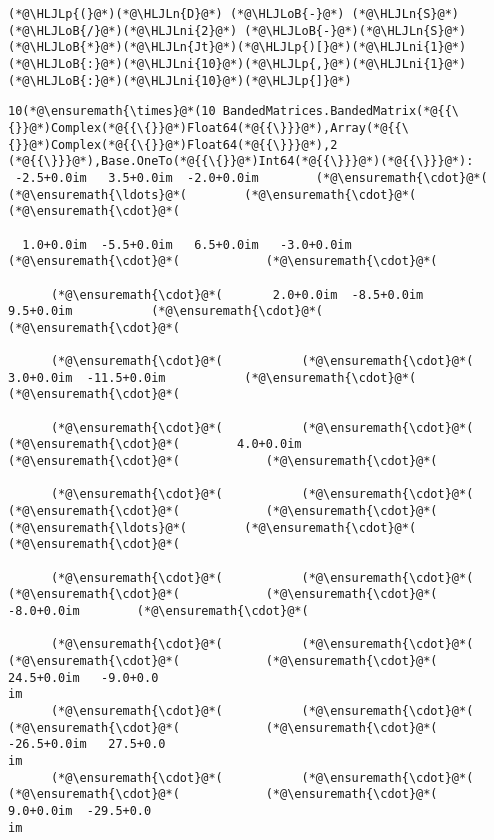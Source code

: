 \documentclass[12pt,landscape]{article}
\newcommand{\HLJLn}[1]{#1}
\newcommand{\HLJLni}[1]{\textcolor[RGB]{59,151,46}{#1}}
\newcommand{\HLJLoB}[1]{\textcolor[RGB]{102,102,102}{\textbf{#1}}}
\newcommand{\HLJLp}[1]{#1}
\begin{document}
{\begin{lstlisting}
(*@\HLJLp{(}@*)(*@\HLJLn{D}@*) (*@\HLJLoB{-}@*) (*@\HLJLn{S}@*)(*@\HLJLoB{/}@*)(*@\HLJLni{2}@*) (*@\HLJLoB{-}@*)(*@\HLJLn{S}@*)(*@\HLJLoB{*}@*)(*@\HLJLn{Jt}@*)(*@\HLJLp{)[}@*)(*@\HLJLni{1}@*)(*@\HLJLoB{:}@*)(*@\HLJLni{10}@*)(*@\HLJLp{,}@*)(*@\HLJLni{1}@*)(*@\HLJLoB{:}@*)(*@\HLJLni{10}@*)(*@\HLJLp{]}@*)
\end{lstlisting}

\begin{lstlisting}
10(*@\ensuremath{\times}@*(10 BandedMatrices.BandedMatrix(*@{{\{}}@*)Complex(*@{{\{}}@*)Float64(*@{{\}}}@*),Array(*@{{\{}}@*)Complex(*@{{\{}}@*)Float64(*@{{\}}}@*),2
(*@{{\}}}@*),Base.OneTo(*@{{\{}}@*)Int64(*@{{\}}}@*)(*@{{\}}}@*):
 -2.5+0.0im   3.5+0.0im  -2.0+0.0im        (*@\ensuremath{\cdot}@*(      (*@\ensuremath{\ldots}@*(        (*@\ensuremath{\cdot}@*(            (*@\ensuremath{\cdot}@*(  
  
  1.0+0.0im  -5.5+0.0im   6.5+0.0im   -3.0+0.0im           (*@\ensuremath{\cdot}@*(            (*@\ensuremath{\cdot}@*(  
  
      (*@\ensuremath{\cdot}@*(       2.0+0.0im  -8.5+0.0im    9.5+0.0im           (*@\ensuremath{\cdot}@*(            (*@\ensuremath{\cdot}@*(  
  
      (*@\ensuremath{\cdot}@*(           (*@\ensuremath{\cdot}@*(       3.0+0.0im  -11.5+0.0im           (*@\ensuremath{\cdot}@*(            (*@\ensuremath{\cdot}@*(  
  
      (*@\ensuremath{\cdot}@*(           (*@\ensuremath{\cdot}@*(           (*@\ensuremath{\cdot}@*(        4.0+0.0im           (*@\ensuremath{\cdot}@*(            (*@\ensuremath{\cdot}@*(  
  
      (*@\ensuremath{\cdot}@*(           (*@\ensuremath{\cdot}@*(           (*@\ensuremath{\cdot}@*(            (*@\ensuremath{\cdot}@*(      (*@\ensuremath{\ldots}@*(        (*@\ensuremath{\cdot}@*(            (*@\ensuremath{\cdot}@*(  
  
      (*@\ensuremath{\cdot}@*(           (*@\ensuremath{\cdot}@*(           (*@\ensuremath{\cdot}@*(            (*@\ensuremath{\cdot}@*(          -8.0+0.0im        (*@\ensuremath{\cdot}@*(  
  
      (*@\ensuremath{\cdot}@*(           (*@\ensuremath{\cdot}@*(           (*@\ensuremath{\cdot}@*(            (*@\ensuremath{\cdot}@*(          24.5+0.0im   -9.0+0.0
im
      (*@\ensuremath{\cdot}@*(           (*@\ensuremath{\cdot}@*(           (*@\ensuremath{\cdot}@*(            (*@\ensuremath{\cdot}@*(         -26.5+0.0im   27.5+0.0
im
      (*@\ensuremath{\cdot}@*(           (*@\ensuremath{\cdot}@*(           (*@\ensuremath{\cdot}@*(            (*@\ensuremath{\cdot}@*(           9.0+0.0im  -29.5+0.0
im
\end{lstlisting}


}
\end{document}
